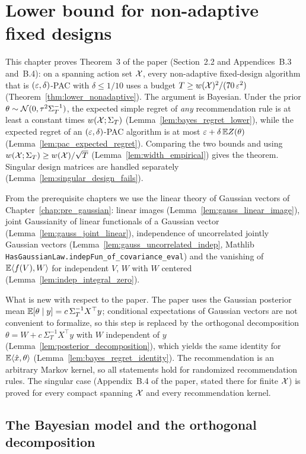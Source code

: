 \chapter{Lower bound for non-adaptive fixed designs}
\label{chap:lower_nonadaptive}

This chapter proves Theorem~3 of the paper (Section~2.2 and Appendices~B.3 and~B.4): on a
spanning action set $\mathcal{X}$, every non-adaptive fixed-design algorithm that is $(\varepsilon,\delta)$-PAC
with $\delta \le 1/10$ uses a budget $T \ge w(\mathcal{X})^2/(70\,\varepsilon^2)$
(Theorem~\ref{thm:lower_nonadaptive}). The argument is
Bayesian. Under the prior $\theta \sim \mathcal{N}(0, \tau^2 \Sigma_T^{-1})$, the expected simple
regret of \emph{any} recommendation rule is at least a constant times
$w(\mathcal{X};\Sigma_T)$ (Lemma~\ref{lem:bayes_regret_lower}), while the expected regret of an
$(\varepsilon,\delta)$-PAC algorithm is at most $\varepsilon + \delta\,\mathbb{E} Z(\theta)$
(Lemma~\ref{lem:pac_expected_regret}). Comparing the two bounds and using
$w(\mathcal{X};\Sigma_T) \ge w(\mathcal{X})/\sqrt T$ (Lemma~\ref{lem:width_empirical}) gives the
theorem. Singular design matrices are handled separately
(Lemma~\ref{lem:singular_design_fails}).

From the prerequisite chapters we use the linear theory of Gaussian vectors of
Chapter~\ref{chap:pre_gaussian}: linear images (Lemma~\ref{lem:gauss_linear_image}), joint
Gaussianity of linear functionals of a Gaussian vector (Lemma~\ref{lem:gauss_joint_linear}),
independence of uncorrelated jointly Gaussian vectors
(Lemma~\ref{lem:gauss_uncorrelated_indep}, Mathlib
\texttt{HasGaussianLaw.indepFun\_of\_covariance\_eval}) and the vanishing of
$\mathbb{E}\langle f(V), W \rangle$ for independent $V$, $W$ with $W$ centered
(Lemma~\ref{lem:indep_integral_zero}).

What is new with respect to the paper. The paper uses the Gaussian posterior mean
$\mathbb{E}[\theta \mid y] = c\,\Sigma_T^{-1}X^\top y$; conditional expectations of Gaussian vectors
are not convenient to formalize, so this step is replaced by the orthogonal decomposition
$\theta = W + c\,\Sigma_T^{-1}X^\top y$ with $W$ independent of $y$
(Lemma~\ref{lem:posterior_decomposition}), which yields the same identity for
$\mathbb{E}\langle \hat{x}, \theta \rangle$ (Lemma~\ref{lem:bayes_regret_identity}). The recommendation is an
arbitrary Markov kernel, so all statements hold for randomized recommendation rules. The
singular case (Appendix~B.4 of the paper, stated there for finite $\mathcal{X}$) is proved for every
compact spanning $\mathcal{X}$ and every recommendation kernel.

\section{The Bayesian model and the orthogonal decomposition}
\label{sec:lower_nonadaptive_bayes}

